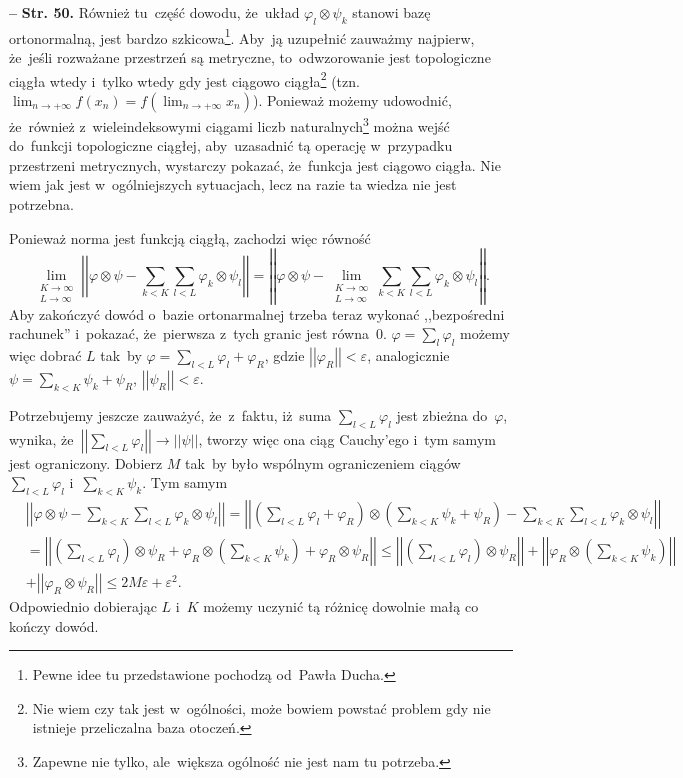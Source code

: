\documentclass[a4paper,11pt]{article}
\newcommand{\ra}{\rightarrow}
\newcommand{\wtw}{wtedy i~tylko wtedy}
\newcommand{\veps}{\varepsilon}
\newcommand{\vp}{\varphi}
\newcommand{\ot}{\otimes}
\newcommand{\Lim}{\lim\limits}
\newcommand{\Sum}{\sum\limits}
\newcommand{\norm}[1]{\left|\left| #1 \right|\right|}
\newcommand{\tb}{\textbf}
\newcommand{\noi}{\noindent}
\newcommand{\start}{\noi \tb{--} {}}
\newcommand{\Str}[1]{\tb{Str. #1.}}
\begin{document}
\start \Str{50} Również tu~część dowodu, że~układ
$\vp_{ l } \ot \psi_{ k }$ stanowi bazę ortonormalną, jest bardzo
szkicowa\footnote{Pewne idee tu przedstawione pochodzą od~Pawła
  Ducha.}. Aby~ją uzupełnić zauważmy najpierw, że~jeśli rozważane
przestrzeń są metryczne, to~odwzorowanie jest topologiczne
ciągła %
\wtw%
gdy jest ciągowo ciągła\footnote{Nie wiem czy tak jest w~ogólności,
  może bowiem powstać problem gdy nie istnieje przeliczalna baza
  otoczeń.} (tzn.
$\lim_{ n \ra +\infty } f( x_{ n } ) = f( \lim_{ n \ra +\infty } x_{ n
} )$). Ponieważ możemy udowodnić, że~również z~wieleindeksowymi
ciągami liczb naturalnych\footnote{Zapewne nie tylko, ale~większa
  ogólność nie jest nam tu potrzeba.} można wejść do~funkcji
topologiczne ciągłej, aby~uzasadnić tą operację w~przypadku
przestrzeni metrycznych, wystarczy pokazać, że~funkcja jest ciągowo
ciągła. Nie wiem jak jest w~ogólniejszych sytuacjach, lecz na razie ta
wiedza nie jest potrzebna.

Ponieważ norma jest funkcją ciągłą, zachodzi więc równość
\begin{displaymath}
  \Lim_{ \substack{ K \ra \infty \\ L \ra \infty } } \norm{ \vp \ot \psi
    - \Sum_{ k < K }\Sum_{ l < L } \vp_{ k } \ot \psi_{ l } }
  = \norm{ \vp \ot \psi -
    \Lim_{ \substack{ K \ra \infty \\ L \ra \infty } } \Sum_{ k < K }
    \Sum_{ l < L } \vp_{ k } \ot \psi_{ l } }.
\end{displaymath}
Aby zakończyć dowód o~bazie ortonarmalnej trzeba teraz wykonać
,,bezpośredni rachunek'' i~pokazać, że~pierwsza z~tych granic jest
równa~0. $\vp = \sum_{ l } \vp_{ l }$ możemy więc dobrać $L$ tak~by
$\vp = \sum_{ l < L } \vp_{ l } + \vp_{ R }$, gdzie
$\norm{ \vp_{ R } } < \veps$, analogicznie
$\psi = \sum_{ k < K } \psi_{ k } + \psi_{ R }$,
$\norm{ \psi_{ R } } < \veps$.

Potrzebujemy jeszcze zauważyć, że~z~faktu, iż~suma
$\sum_{ l < L } \vp_{ l }$ jest zbieżna do~$\vp$, wynika,
że~$\norm{ \sum_{ l < L } \vp_{ l } } \ra \norm{ \psi }$, tworzy więc
ona ciąg Cauchy'ego i~tym samym jest ograniczony.
Dobierz %
$M$ tak~by było wspólnym ograniczeniem ciągów
$\sum_{ l < L } \vp_{ l }$ i~$\sum_{ k < K } \psi_{ k }$. Tym samym
\begin{displaymath}
  \begin{split}
    & \norm{ \vp \ot \psi - \Sum_{ k < K }\Sum_{ l < L } \vp_{ k } \ot
      \psi_{ l } } = \norm{ ( \Sum_{ l < L } \vp_{ l } + \vp_{ R } )
      \ot ( \Sum_{ k < K } \psi_{ k } + \psi_{ R } )
      - \Sum_{ k < K }\Sum_{ l < L } \vp_{ k } \ot \psi_{ l } } \\
    &= \norm{ ( \Sum_{ l < L } \vp_{ l } ) \ot \psi_{ R } + \vp_{ R }
      \ot ( \Sum_{ k < K } \psi_{ k } ) + \vp_{ R } \ot \psi_{ R } }
    \leq \norm{ ( \Sum_{ l < L } \vp_{ l } ) \ot \psi_{ R } }
    + \norm{ \vp_{ R } \ot ( \Sum_{ k < K } \psi_{ k } ) } \\
    &+ \norm{ \vp_{ R } \ot \psi_{ R } } \leq 2 M \veps + \veps^{ 2 }.
  \end{split}
\end{displaymath}
Odpowiednio dobierając $L$ i~$K$ możemy uczynić tą różnicę dowolnie
małą co kończy dowód.
\end{document}
